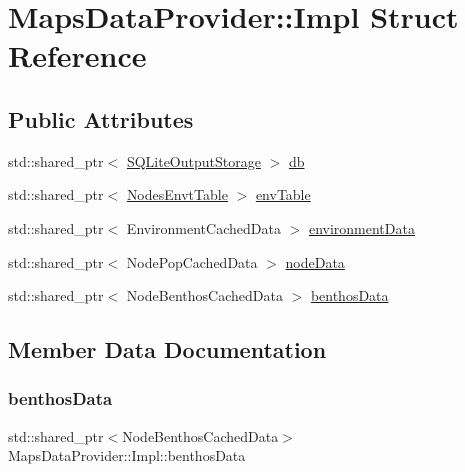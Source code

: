 \hypertarget{struct_maps_data_provider_1_1_impl}{}\section{Maps\+Data\+Provider\+::Impl Struct Reference}
\label{struct_maps_data_provider_1_1_impl}
\subsection*{Public Attributes}
\begin{DoxyCompactItemize}
\item 
std\+::shared\+\_\+ptr$<$ \mbox{\hyperlink{class_s_q_lite_output_storage}{S\+Q\+Lite\+Output\+Storage}} $>$ \mbox{\hyperlink{struct_maps_data_provider_1_1_impl_a20f685ff5afdfa3edd4edaae20b63f26}{db}}
\item 
std\+::shared\+\_\+ptr$<$ \mbox{\hyperlink{class_nodes_envt_table}{Nodes\+Envt\+Table}} $>$ \mbox{\hyperlink{struct_maps_data_provider_1_1_impl_afbf7212bfbc549ce4bf00e20ca3d0462}{env\+Table}}
\item 
std\+::shared\+\_\+ptr$<$ Environment\+Cached\+Data $>$ \mbox{\hyperlink{struct_maps_data_provider_1_1_impl_a6653c8b9854e10cdf8b76423f99f2074}{environment\+Data}}
\item 
std\+::shared\+\_\+ptr$<$ Node\+Pop\+Cached\+Data $>$ \mbox{\hyperlink{struct_maps_data_provider_1_1_impl_a976fa35b2efeb4a4fc61b18d3f7b3e6a}{node\+Data}}
\item 
std\+::shared\+\_\+ptr$<$ Node\+Benthos\+Cached\+Data $>$ \mbox{\hyperlink{struct_maps_data_provider_1_1_impl_a9e8c365e55eb37f5256e3e9128340098}{benthos\+Data}}
\end{DoxyCompactItemize}


\subsection{Member Data Documentation}
\mbox{\label{struct_maps_data_provider_1_1_impl_a9e8c365e55eb37f5256e3e9128340098}} 
\subsubsection{\texorpdfstring{benthosData}{benthosData}}
{\footnotesize\ttfamily std\+::shared\+\_\+ptr$<$Node\+Benthos\+Cached\+Data$>$ Maps\+Data\+Provider\+::\+Impl\+::benthos\+Data}

